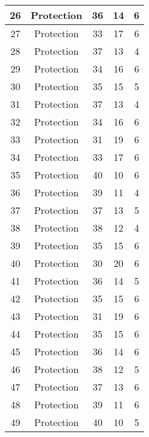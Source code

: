\documentclass[results.tex]{subfiles}
\begin{document}
\begin{center}
\begin{tabular}{| c || c | c | c | c |}
    \hline
    26 & Protection & 36 & 14 & 6 \\ 
    \hline
    27 & Protection & 33 & 17 & 6 \\ 
    \hline
    28 & Protection & 37 & 13 & 4 \\ 
    \hline
    29 & Protection & 34 & 16 & 6 \\ 
    \hline
    30 & Protection & 35 & 15 & 5 \\ 
    \hline
    31 & Protection & 37 & 13 & 4 \\ 
    \hline
    32 & Protection & 34 & 16 & 6 \\ 
    \hline
    33 & Protection & 31 & 19 & 6 \\ 
    \hline
    34 & Protection & 33 & 17 & 6 \\ 
    \hline
    35 & Protection & 40 & 10 & 6 \\ 
    \hline
    36 & Protection & 39 & 11 & 4 \\ 
    \hline
    37 & Protection & 37 & 13 & 5 \\ 
    \hline
    38 & Protection & 38 & 12 & 4 \\ 
    \hline
    39 & Protection & 35 & 15 & 6 \\ 
    \hline
    40 & Protection & 30 & 20 & 6 \\ 
    \hline
    41 & Protection & 36 & 14 & 5 \\ 
    \hline
    42 & Protection & 35 & 15 & 6 \\ 
    \hline
    43 & Protection & 31 & 19 & 6 \\ 
    \hline
    44 & Protection & 35 & 15 & 6 \\ 
    \hline
    45 & Protection & 36 & 14 & 6 \\ 
    \hline
    46 & Protection & 38 & 12 & 5 \\ 
    \hline
    47 & Protection & 37 & 13 & 6 \\ 
    \hline
    48 & Protection & 39 & 11 & 6 \\ 
    \hline
    49 & Protection & 40 & 10 & 5 \\ 
    \hline   \end{tabular}
\end{center}
\end{document}
